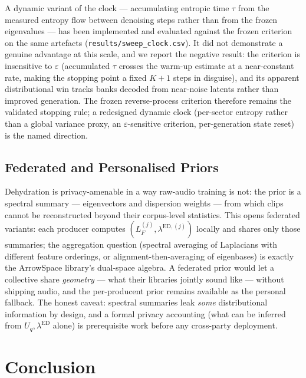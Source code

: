\documentclass[12pt,a4paper]{article}
\begin{document}
A dynamic variant of the clock — accumulating entropic time $\tau$ from
the measured entropy flow between denoising steps rather than from the
frozen eigenvalues — has been implemented and evaluated against the
frozen criterion on the same artefacts
(\texttt{results/sweep\_clock.csv}). It did not demonstrate a genuine
advantage at this scale, and we report the negative result: the
criterion is insensitive to $\varepsilon$ (accumulated $\tau$ crosses
the warm-up estimate at a near-constant rate, making the stopping point
a fixed $K{+}1$ steps in disguise), and its apparent distributional win
tracks banks decoded from near-noise latents rather than improved
generation. The frozen reverse-process criterion therefore remains the
validated stopping rule; a redesigned dynamic clock (per-sector entropy
rather than a global variance proxy, an $\varepsilon$-sensitive
criterion, per-generation state reset) is the named direction.

\subsection{Federated and Personalised Priors}

Dehydration is privacy-amenable in a way raw-audio training is not:
the prior is a spectral summary — eigenvectors and dispersion weights
— from which clips cannot be reconstructed beyond their corpus-level
statistics. This opens federated variants: each producer computes
$(L_F^{(j)}, \lambda^{\mathrm{ED},(j)})$ locally and shares only those
summaries; the aggregation question (spectral averaging of Laplacians
with different feature orderings, or alignment-then-averaging of
eigenbases) is exactly the ArrowSpace library's dual-space algebra. A
federated prior would let a collective share \emph{geometry} — what
their libraries jointly sound like — without shipping audio, and the
per-producent prior remains available as the personal fallback. The
honest caveat: spectral summaries leak \emph{some} distributional
information by design, and a formal privacy accounting (what can be
inferred from $U_q, \lambda^{\mathrm{ED}}$ alone) is prerequisite work
before any cross-party deployment.


\section{Conclusion}
\label{sec:conclusion}
\end{document}
